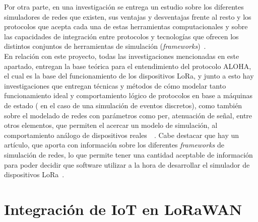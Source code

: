 \begin{justify}
Por otra parte, en una investigación se entrega un estudio sobre los diferentes simuladores de redes que existen, sus ventajas y desventajas frente al resto y los protocolos que acepta cada una de estas herramientas computacionales y sobre las capacidades de integración entre protocolos y tecnologías que ofrecen los distintos conjuntos de herramientas de simulación (\textit{frameworks})~\cite{Murat}.\\
En relación con este proyecto, todas las investigaciones mencionadas en este apartado, entregan la base teórica para el entendimiento del protocolo ALOHA, el cual es la base del funcionamiento de los dispositivos LoRa, y junto a esto hay investigaciones que entregan técnicas y métodos de cómo modelar tanto funcionamiento ideal y comportamiento lógico de protocolos en base a máquinas de estado ( en el caso de una simulación de eventos discretos), como también sobre el modelado de redes con parámetros como \gls{per}, atenuación de señal, entre otros elementos, que permiten el acercar un modelo de simulación, al comportamiento análogo de dispositivos reales~\cite{Abdullah}~\cite{simulato}. Cabe destacar que hay un artículo, que aporta con información sobre los diferentes \textit{frameworks} de simulación de redes, lo que permite tener una cantidad aceptable de información para poder decidir que software utilizar a la hora de desarrollar el simulador de dispositivos LoRa~\cite{Murat}.

\section{Integración de IoT en LoRaWAN}


\end{justify}
